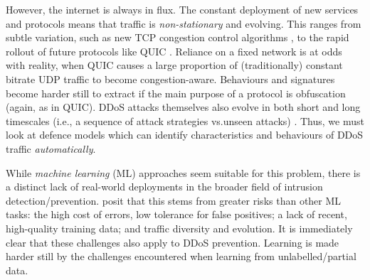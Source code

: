 \documentclass[10pt, times, conference, letterpaper]{IEEEtran}
\begin{document}
However, the internet is always in flux.
The constant deployment of new services and protocols means that traffic is \emph{non-stationary} and evolving.
This ranges from subtle variation, such as new TCP congestion control algorithms \cite{rfc8312}, to the rapid rollout \cite{DBLP:conf/pam/RuthPDH18} of future protocols like QUIC \cite{DBLP:conf/sigcomm/LangleyRWVKZYKS17}.
Reliance on a fixed network is at odds with reality, when QUIC causes a large proportion of (traditionally) constant bitrate UDP traffic to become congestion-aware.
Behaviours and signatures become harder still to extract if the main purpose of a protocol is obfuscation (again, as in QUIC).
DDoS attacks themselves also evolve in both short and long timescales (i.e., a sequence of attack strategies vs.\@ unseen attacks) \cite{DBLP:conf/spw/KangGS16}.
Thus, we must look at defence models which can identify characteristics and behaviours of DDoS traffic \emph{automatically}.


While \emph{machine learning} (ML) approaches seem suitable for this problem, there is a distinct lack of real-world deployments in the broader field of intrusion detection/prevention.
\Textcite{DBLP:conf/sp/SommerP10} posit that this stems from greater risks than other ML tasks: the high cost of errors, low tolerance for false positives; a lack of recent, high-quality training data; and traffic diversity and evolution.
It is immediately clear that these challenges also apply to DDoS prevention.
Learning is made harder still by the challenges encountered when learning from unlabelled/partial data.
\end{document}
